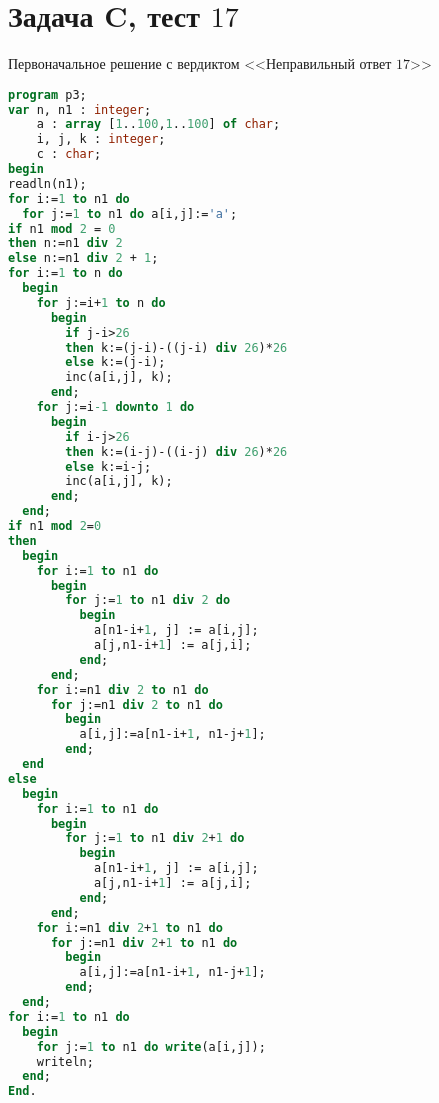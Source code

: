\appendix

\chapter{Задача \textbf{C}, тест $17$}\label{pril1}

\begin{algorithm}[!h] 
\caption{Первоначальное решение с вердиктом <<Неправильный ответ $17$>>}\label{lstA1:apx} 
\begin{lstlisting}[basicstyle=\tiny, language=pascal]
program p3;
var n, n1 : integer;
    a : array [1..100,1..100] of char;
    i, j, k : integer;
    c : char;
begin
readln(n1);
for i:=1 to n1 do
  for j:=1 to n1 do a[i,j]:='a';
if n1 mod 2 = 0
then n:=n1 div 2
else n:=n1 div 2 + 1;
for i:=1 to n do
  begin
    for j:=i+1 to n do
      begin
        if j-i>26
        then k:=(j-i)-((j-i) div 26)*26
        else k:=(j-i);
        inc(a[i,j], k);
      end;
    for j:=i-1 downto 1 do
      begin
        if i-j>26
        then k:=(i-j)-((i-j) div 26)*26
        else k:=i-j;
        inc(a[i,j], k);
      end;
  end;
if n1 mod 2=0
then
  begin
    for i:=1 to n1 do
      begin
        for j:=1 to n1 div 2 do
          begin
            a[n1-i+1, j] := a[i,j];
            a[j,n1-i+1] := a[j,i];
          end;
      end;
    for i:=n1 div 2 to n1 do
      for j:=n1 div 2 to n1 do
        begin
          a[i,j]:=a[n1-i+1, n1-j+1];
        end;
  end
else
  begin
    for i:=1 to n1 do
      begin
        for j:=1 to n1 div 2+1 do
          begin
            a[n1-i+1, j] := a[i,j];
            a[j,n1-i+1] := a[j,i];
          end;
      end;
    for i:=n1 div 2+1 to n1 do
      for j:=n1 div 2+1 to n1 do
        begin
          a[i,j]:=a[n1-i+1, n1-j+1];
        end;
  end;
for i:=1 to n1 do
  begin    
    for j:=1 to n1 do write(a[i,j]);
    writeln;
  end;
End.
\end{lstlisting} 
\end{algorithm}

